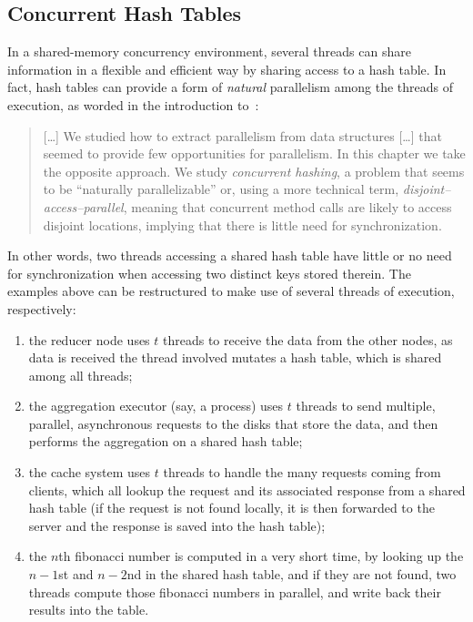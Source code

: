 \subsection{Concurrent Hash Tables}\label{subsec:concurrent-hash-tables}

In a shared-memory concurrency environment, several threads can share information in a flexible and efficient way by sharing access to a hash table.
In fact, hash tables can provide a form of \emph{natural} parallelism among the threads of execution, as worded in the introduction to~\cite[Chapter~13]{art-mp}:
\begin{quote}
    [\ldots] We studied how to extract parallelism from data structures [\ldots] that seemed to provide few opportunities for parallelism.
    In this chapter we take the opposite approach.
    We study \emph{{concurrent hashing}}, a problem that seems to be ``naturally parallelizable'' or, using a more technical term, \emph{{disjoint--access--parallel}}, meaning that concurrent method calls are likely to access disjoint locations, implying that there is little need for synchronization.
\end{quote}
In other words, two threads accessing a shared hash table have little or no need for synchronization when accessing two distinct keys stored therein.
The examples above can be restructured to make use of several threads of execution, respectively:
\begin{enumerate}
    \item the reducer node uses $t$ threads to receive the data from the other nodes, as data is received the thread involved mutates a hash table, which is shared among all threads;
    \item the aggregation executor (say, a process) uses $t$ threads to send multiple, parallel, asynchronous requests to the disks that store the data, and then performs the aggregation on a shared hash table;
    \item the cache system uses $t$ threads to handle the many requests coming from clients, which all lookup the request and its associated response from a shared hash table (if the request is not found locally, it is then forwarded to the server and the response is saved into the hash table);
    \item the $n$th fibonacci number is computed in a very short time, by looking up the $n - 1$st and $n - 2$nd in the shared hash table, and if they are not found, two threads compute those fibonacci numbers in parallel, and write back their results into the table.
\end{enumerate}

